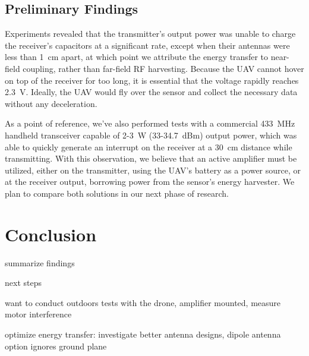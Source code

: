 \documentclass[conference]{IEEEtran}
\begin{document}
\subsection{Preliminary Findings}

Experiments revealed that the transmitter's output power was unable to charge the receiver's capacitors at a significant rate, except when their antennas were less than 1~cm apart, at which point we attribute the energy transfer to near-field coupling, rather than far-field RF harvesting. Because the UAV cannot hover on top of the receiver for too long, it is essential that the voltage rapidly reaches 2.3~V. Ideally, the UAV would fly over the sensor and collect the necessary data without any deceleration.

As a point of reference, we've also performed tests with a commercial 433~MHz handheld transceiver capable of 2-3~W (33-34.7~dBm) output power, which was able to quickly generate an interrupt on the receiver at a 30~cm distance while transmitting. With this observation, we believe that an active amplifier must be utilized, either on the transmitter, using the UAV's battery as a power source, or at the receiver output, borrowing power from the sensor's energy harvester. We plan to compare both solutions in our next phase of research.

\section{Conclusion}

summarize findings

next steps

want to conduct outdoors tests with the drone, amplifier mounted, measure motor interference

optimize energy transfer: investigate better antenna designs, dipole antenna option ignores ground plane



\end{document}
